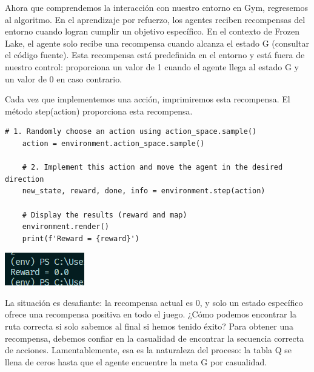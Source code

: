 \documentclass{article}
\begin{document}
\vspace{0.5cm}

Ahora que comprendemos la interacción con nuestro entorno en Gym, regresemos al algoritmo. En el aprendizaje por refuerzo, los agentes reciben recompensas del entorno cuando logran cumplir un objetivo específico. En el contexto de Frozen Lake, el agente solo recibe una recompensa cuando alcanza el estado G (consultar el código fuente). Esta recompensa está predefinida en el entorno y está fuera de nuestro control: proporciona un valor de 1 cuando el agente llega al estado G y un valor de 0 en caso contrario.

\vspace{0.5cm}

Cada vez que implementemos una acción, imprimiremos esta recompensa. El método step(action) proporciona esta recompensa.

\vspace{0.5cm}

\begin{lstlisting}[style=mystyle]
    # 1. Randomly choose an action using action_space.sample()
    action = environment.action_space.sample()
    
    # 2. Implement this action and move the agent in the desired direction
    new_state, reward, done, info = environment.step(action)
    
    # Display the results (reward and map)
    environment.render()
    print(f'Reward = {reward}')
\end{lstlisting}

\vspace{0.5cm}

\begin{center}
    \includegraphics[width=0.5\linewidth]{reward0.png}
\end{center}

\vspace{0.5cm}

La situación es desafiante: la recompensa actual es 0, y solo un estado específico ofrece una recompensa positiva en todo el juego. ¿Cómo podemos encontrar la ruta correcta si solo sabemos al final si hemos tenido éxito? Para obtener una recompensa, debemos confiar en la casualidad de encontrar la secuencia correcta de acciones. Lamentablemente, esa es la naturaleza del proceso: la tabla Q se llena de ceros hasta que el agente encuentre la meta G por casualidad.
\end{document}
